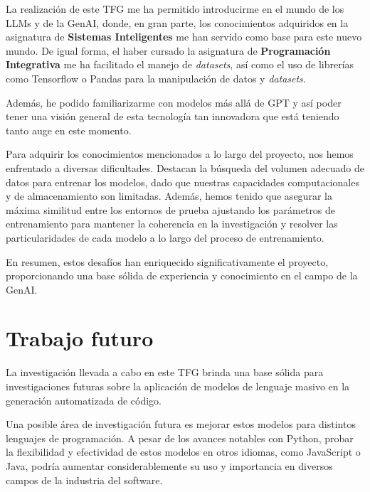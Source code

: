 La realización de este \acrshort{TFG} me ha permitido introducirme en el mundo de los \acrshort{LLMs} y de la \acrshort{GenAI}, donde, en gran parte, los conocimientos adquiridos en la asignatura de \textbf{Sistemas Inteligentes} me han servido como base para este nuevo mundo. De igual forma, el haber cursado la asignatura de \textbf{Programación Integrativa} me ha facilitado el manejo de \textit{datasets}, así como el uso de librerías como Tensorflow o Pandas para la manipulación de datos y \textit{datasets}.

\bigskip %

Además, he podido familiarizarme con modelos más allá de \acrshort{GPT} y así poder tener una visión general de esta tecnología tan innovadora que está teniendo tanto auge en este momento.

\bigskip %

Para adquirir los conocimientos mencionados a lo largo del proyecto, nos hemos enfrentado a diversas dificultades. Destacan la búsqueda del volumen adecuado de datos para entrenar los modelos, dado que nuestras capacidades computacionales y de almacenamiento son limitadas. Además, hemos tenido que asegurar la máxima similitud entre los entornos de prueba ajustando los parámetros de entrenamiento para mantener la coherencia en la investigación y resolver las particularidades de cada modelo a lo largo del proceso de entrenamiento. 

\bigskip %

En resumen, estos desafíos han enriquecido significativamente el proyecto, proporcionando una base sólida de experiencia y conocimiento en el campo de la \acrfull{GenAI}.

\section{Trabajo futuro}

La investigación llevada a cabo en este \acrfull{TFG} brinda una base sólida para investigaciones futuras sobre la aplicación de modelos de lenguaje masivo en la generación automatizada de código. 

\bigskip %

Una posible área de investigación futura es mejorar estos modelos para distintos lenguajes de programación. A pesar de los avances notables con Python, probar la flexibilidad y efectividad de estos modelos en otros idiomas, como JavaScript o Java, podría aumentar considerablemente su uso y importancia en diversos campos de la industria del software.

